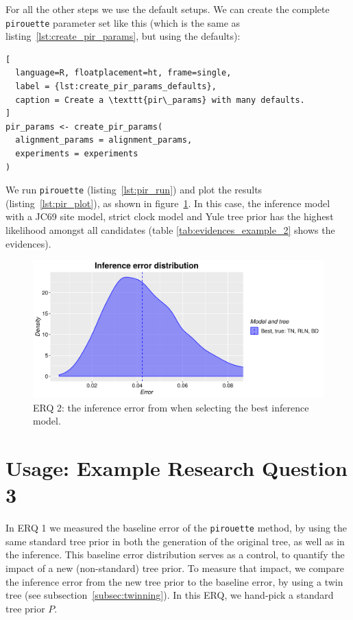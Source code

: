 \documentclass{article}
\begin{document}
For all the other steps we use the default setups. 
We can create the complete
\verb;pirouette; parameter set like this (which is the
same as listing~\ref{lst:create_pir_params}, but using the defaults):

\begin{lstlisting}[
  language=R, floatplacement=ht, frame=single,
  label = {lst:create_pir_params_defaults},
  caption = Create a \texttt{pir\_params} with many defaults.
]
pir_params <- create_pir_params(
  alignment_params = alignment_params,
  experiments = experiments
)
\end{lstlisting}

We run \verb;pirouette; (listing~\ref{lst:pir_run}) 
and plot the results (listing~\ref{lst:pir_plot}),
as shown in figure~\ref{fig:example_2}.
In this case, the inference model with a JC69 site model, 
strict clock model and Yule tree prior has the highest likelihood
amongst all candidates (table \ref{tab:evidences_example_2} shows
the evidences).

\begin{figure}[H]
  \includegraphics[width=\textwidth]{example_2/errors.png}
  \caption{
    ERQ 2: the inference error from
    when selecting the best inference model.
  }
  \label{fig:example_2}
\end{figure}

\section{Usage: Example Research Question 3}

In ERQ 1 we measured the baseline error of the \verb;pirouette; method,
by using the same standard tree prior in both the generation of 
the original tree, as well as in the inference.
This baseline error distribution serves as a control,
to quantify the impact of a new (non-standard) tree prior.
To measure that impact, we compare the inference error 
from the new tree prior to the baseline error,
by using a twin tree (see subsection~\ref{subsec:twinning}).
In this ERQ, we hand-pick a standard tree prior $\mathit{P}$.
\end{document}
